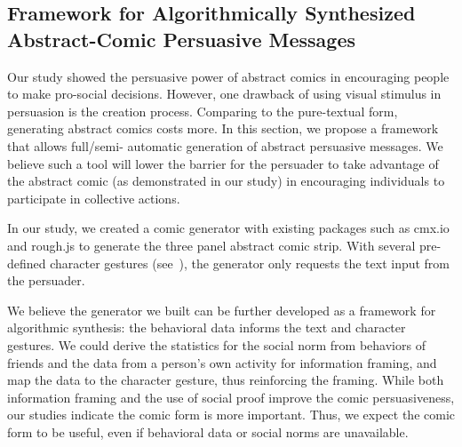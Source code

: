 
 \subsection{Framework for Algorithmically Synthesized Abstract-Comic Persuasive Messages}
 Our study showed the persuasive power of abstract comics in encouraging people to make pro-social decisions. However, one drawback of using visual stimulus in persuasion is the creation process. Comparing to the pure-textual form, generating abstract comics costs more. In this section, we propose a framework that allows full/semi- automatic generation of abstract persuasive messages. We believe such a tool will lower the barrier for the persuader to take advantage of the abstract comic (as demonstrated in our study) in encouraging individuals to participate in collective actions.

 In our study, we created a comic generator with existing packages such as cmx.io and rough.js to generate the three panel abstract comic strip. With several pre-defined character gestures (see~), the generator only requests the text input from the persuader.  

 We believe the generator we built can be further developed as a framework for algorithmic synthesis: the behavioral data informs the text and character gestures. We could derive the statistics for the social norm from behaviors of friends and the data from a person's own activity for information framing, and map the data to the character gesture, thus reinforcing the framing. While both information framing and the use of social proof improve the comic persuasiveness, our studies indicate the comic form is more important. Thus, we expect the comic form to be useful, even if behavioral data or social norms are unavailable.

